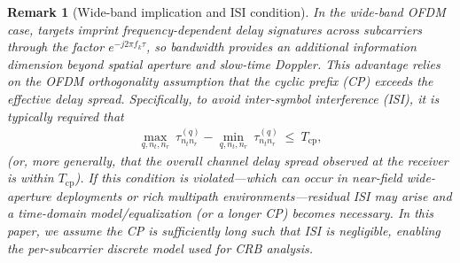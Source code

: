 \documentclass[9pt,final,journal,twocolumn]{IEEEtran}
\newtheorem{remark}{Remark}
\begin{document}
\begin{remark}[Wide-band implication and ISI condition]
In the wide-band OFDM case, targets imprint frequency-dependent delay signatures across subcarriers through the factor $e^{-j2\pi f_k \tau}$, so bandwidth provides an additional information dimension beyond spatial aperture and slow-time Doppler. This advantage relies on the OFDM orthogonality assumption that the cyclic prefix (CP) exceeds the effective delay spread. Specifically, to avoid inter-symbol interference (ISI), it is typically required that
\begin{align}
\max_{q,n_t,n_r}\ \tau_{n_tn_r}^{(q)} - \min_{q,n_t,n_r}\ \tau_{n_tn_r}^{(q)} \ \le\ T_{\mathrm{cp}},
\end{align}
(or, more generally, that the overall channel delay spread observed at the receiver is within $T_{\mathrm{cp}}$). If this condition is violated---which can occur in near-field wide-aperture deployments or rich multipath environments---residual ISI may arise and a time-domain model/equalization (or a longer CP) becomes necessary. In this paper, we assume the CP is sufficiently long such that ISI is negligible, enabling the per-subcarrier discrete model used for CRB analysis.
\end{remark}
\end{document}
